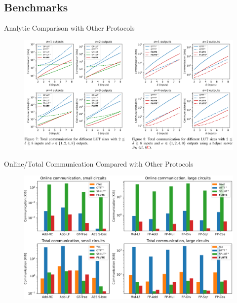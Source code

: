 \documentclass[../240906_cryptlab_flute.tex]{subfiles}
\begin{document}
\subsection{Benchmarks}

\begin{frame}{Analytic Comparison with Other Protocols}
    \begin{figure}[H]
        \includegraphics[width=\textwidth]{../images/analytic_comparison.png}
    \end{figure}
\end{frame}

\begin{frame}{Online/Total Communication Compared with Other Protocols}
    \begin{figure}[H]
        \includegraphics[width=\textwidth]{../images/comm_bench.png}
    \end{figure}
\end{frame}
\end{document}
